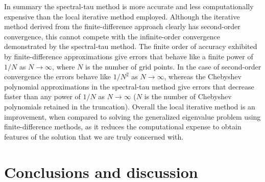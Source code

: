 \documentclass[a4paper, 12pt, twoside, openright]{article}
\numberwithin{equation}{section}
\begin{document}
In summary the spectral-tau method is more accurate and less computationally expensive than the local iterative method employed. Although the iterative method derived from the finite-difference approach clearly has second-order convergence, this cannot compete with the infinite-order convergence demonstrated by the spectral-tau method. The finite order of accuracy exhibited by finite-difference approximations give errors that behave like a finite power of $1/N$ as $N\rightarrow\infty$, where $N$ is the number of grid points. In the case of second-order convergence the errors behave like $1/N^2$ as $N\rightarrow\infty$, whereas the Chebyshev polynomial approximations in the spectral-tau method give errors that decrease faster than any power of $1/N$ as $N\rightarrow\infty$ ($N$ is the number of Chebyshev polynomials retained in the truncation). Overall the local iterative method is an improvement, when compared to solving the generalized eigenvalue problem using finite-difference methods, as it reduces the computational expense to obtain features of the solution that we are truly concerned with. %
 
% 
%
%
%

\newpage
\section{Conclusions and discussion} %

%
\end{document}
